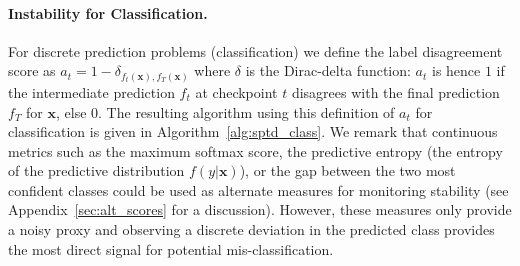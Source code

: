 

\paragraph{Instability for Classification.} For discrete prediction problems (\ie classification) we define the label disagreement score as $a_t = 1- \delta_{f_t(\bm{x}),f_T(\bm{x})}$ where $\delta$ is the Dirac-delta function: $a_t$ is hence $1$ if the intermediate prediction $f_t$ at checkpoint $t$ disagrees with the final prediction $f_T$ for $\bm{x}$, else $0$. The resulting algorithm using this definition of $a_t$ for classification is given in Algorithm~\ref{alg:sptd_class}. We remark that continuous metrics such as the maximum softmax score, the predictive entropy (\ie the entropy of the predictive distribution $f(y|\bm{x})$), or the gap between the two most confident classes could be used as alternate measures for monitoring stability (see Appendix~\ref{sec:alt_scores} for a discussion). However, these measures only provide a noisy proxy and observing a discrete deviation in the predicted class provides the most direct signal for potential mis-classification.

